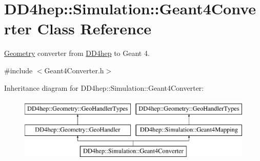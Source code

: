 \hypertarget{class_d_d4hep_1_1_simulation_1_1_geant4_converter}{}\section{D\+D4hep\+:\+:Simulation\+:\+:Geant4\+Converter Class Reference}
\label{class_d_d4hep_1_1_simulation_1_1_geant4_converter}


\hyperlink{namespace_d_d4hep_1_1_geometry}{Geometry} converter from \hyperlink{namespace_d_d4hep}{D\+D4hep} to Geant 4.  




{\ttfamily \#include $<$Geant4\+Converter.\+h$>$}

Inheritance diagram for D\+D4hep\+:\+:Simulation\+:\+:Geant4\+Converter\+:\begin{figure}[H]
\begin{center}
\leavevmode
\includegraphics[height=3.000000cm]{class_d_d4hep_1_1_simulation_1_1_geant4_converter}
\end{center}
\end{figure}
